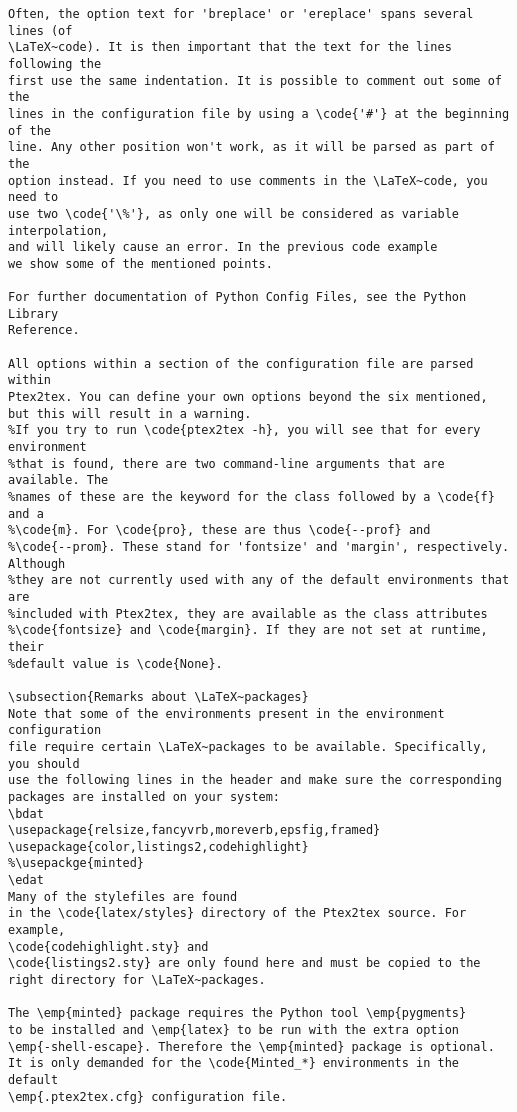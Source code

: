 \documentclass[a4paper,11pt]{article}
\begin{document}
{{{{{{{{{{{\begin{Verbatim}
Often, the option text for 'breplace' or 'ereplace' spans several lines (of
\LaTeX~code). It is then important that the text for the lines following the
first use the same indentation. It is possible to comment out some of the
lines in the configuration file by using a \code{'#'} at the beginning of the
line. Any other position won't work, as it will be parsed as part of the
option instead. If you need to use comments in the \LaTeX~code, you need to
use two \code{'\%'}, as only one will be considered as variable interpolation,
and will likely cause an error. In the previous code example
we show some of the mentioned points.

For further documentation of Python Config Files, see the Python Library
Reference.

All options within a section of the configuration file are parsed within
Ptex2tex. You can define your own options beyond the six mentioned,
but this will result in a warning.
%If you try to run \code{ptex2tex -h}, you will see that for every environment
%that is found, there are two command-line arguments that are available. The
%names of these are the keyword for the class followed by a \code{f} and a
%\code{m}. For \code{pro}, these are thus \code{--prof} and
%\code{--prom}. These stand for 'fontsize' and 'margin', respectively. Although
%they are not currently used with any of the default environments that are
%included with Ptex2tex, they are available as the class attributes
%\code{fontsize} and \code{margin}. If they are not set at runtime, their
%default value is \code{None}.

\subsection{Remarks about \LaTeX~packages}
Note that some of the environments present in the environment configuration
file require certain \LaTeX~packages to be available. Specifically, you should
use the following lines in the header and make sure the corresponding
packages are installed on your system: 
\bdat
\usepackage{relsize,fancyvrb,moreverb,epsfig,framed}
\usepackage{color,listings2,codehighlight}
%\usepackge{minted}
\edat
Many of the stylefiles are found
in the \code{latex/styles} directory of the Ptex2tex source. For example,
\code{codehighlight.sty} and
\code{listings2.sty} are only found here and must be copied to the
right directory for \LaTeX~packages.

The \emp{minted} package requires the Python tool \emp{pygments}
to be installed and \emp{latex} to be run with the extra option
\emp{-shell-escape}. Therefore the \emp{minted} package is optional.
It is only demanded for the \code{Minted_*} environments in the default
\emp{.ptex2tex.cfg} configuration file.


\end{Verbatim}}}}}}}}}}}}
\end{document}
